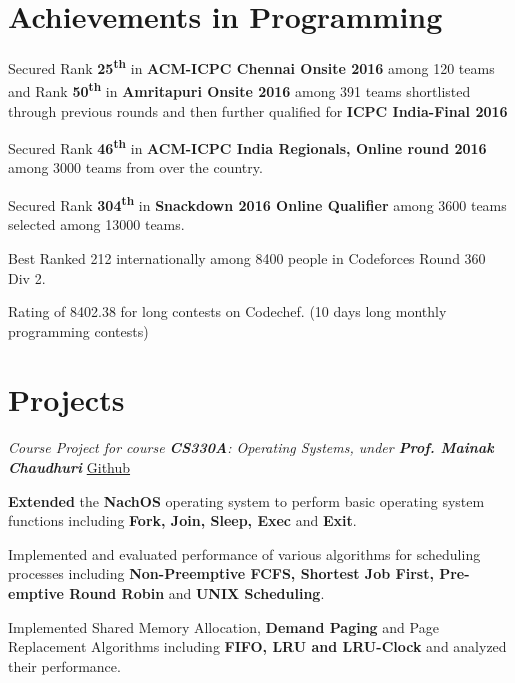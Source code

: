 \documentclass[a4paper]{norm-resume}
\begin{document}

\section{Achievements in Programming \hrulefill}

\vspace{5mm} %

\begin{tightitemize}
    \item Secured Rank \textbf{25\textsuperscript{th}} in \textbf{ACM-ICPC Chennai Onsite 2016} among 120 teams and Rank \textbf{50\textsuperscript{th}} in \textbf{Amritapuri Onsite 2016} among 391 teams shortlisted through previous rounds and then further qualified for \textbf{ICPC India-Final 2016}
    \item Secured Rank \textbf{46\textsuperscript{th}} in \textbf{ACM-ICPC India Regionals, Online round 2016} among 3000 teams from over the country.
    \item Secured Rank \textbf{304\textsuperscript{th}} in \textbf{Snackdown 2016 Online Qualifier} among 3600 teams selected among 13000 teams.
    \item Best Ranked 212 internationally among 8400 people in Codeforces Round 360 Div 2.
	\item Rating of 8402.38 for long contests on Codechef. (10 days long monthly programming contests)
\end{tightitemize}


\section{Projects \hrulefill}

\vspace{2mm} %

       
    \emph{Course Project for course \textbf{CS330A}: Operating Systems, under \textbf{Prof. Mainak Chaudhuri}} \hfill \small \href{https://github.com/sakshamsharma/cs330assignments}{Github}
    \vspace{3mm}
    \begin{tightitemize}
    \small
    {
    \item \textbf{Extended} the \textbf{NachOS} operating system to perform basic operating system functions including \textbf{Fork, Join, Sleep, Exec} and \textbf{Exit}.
    \item Implemented and evaluated performance of various algorithms for scheduling processes including \textbf{Non-Preemptive FCFS, Shortest Job First, Pre-emptive Round Robin} and \textbf{UNIX Scheduling}.
    \item Implemented Shared Memory Allocation, \textbf{Demand Paging} and Page Replacement Algorithms including \textbf{FIFO, LRU and LRU-Clock} and analyzed their performance.
    }
    \end{tightitemize}
\end{document}
